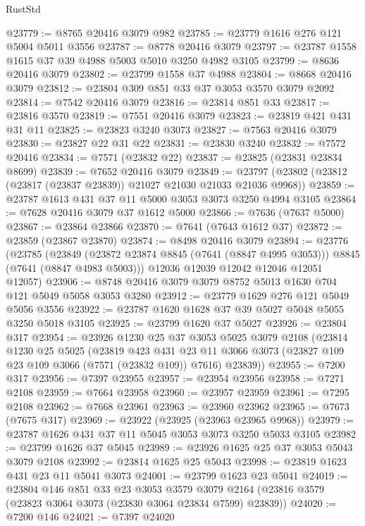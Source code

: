 \begin{lexlean}{RustStd}
\begin{coremodule}
@23779 := @8765 @20416 @3079 @982
@23785 := @23779 @1616 @276 @121 @5004 @5011 @3556
@23787 := @8778 @20416 @3079
@23797 := @23787 @1558 @1615 @37 @39 @4988 @5003 @5010 @3250 @4982 @3105
@23799 := @8636 @20416 @3079
@23802 := @23799 @1558 @37 @4988
@23804 := @8668 @20416 @3079
@23812 := @23804 @309 @851 @33 @37 @3053 @3570 @3079 @2092
@23814 := @7542 @20416 @3079
@23816 := @23814 @851 @33
@23817 := @23816 @3570
@23819 := @7551 @20416 @3079
@23823 := @23819 @421 @431 @31 @11
@23825 := @23823 @3240 @3073
@23827 := @7563 @20416 @3079
@23830 := @23827 @22 @31 @22
@23831 := @23830 @3240
@23832 := @7572 @20416
@23834 := @7571 (@23832 @22)
@23837 := @23825 (@23831 @23834 @8699)
@23839 := @7652 @20416 @3079
@23849 := @23797 (@23802 (@23812 (@23817 (@23837 @23839)) @21027 @21030 @21033 @21036 @9968))
@23859 := @23787 @1613 @431 @37 @11 @5000 @3053 @3073 @3250 @4994 @3105
@23864 := @7628 @20416 @3079 @37 @1612 @5000
@23866 := @7636 (@7637 @5000)
@23867 := @23864 @23866
@23870 := @7641 (@7643 @1612 @37)
@23872 := @23859 (@23867 @23870)
@23874 := @8498 @20416 @3079
@23894 := @23776
    (@23785
      (@23849 (@23872 @23874 @8845 (@7641 (@8847 @4995 @3053))) @8845 (@7641 (@8847 @4983 @5003)))
      @12036
      @12039
      @12042
      @12046
      @12051
      @12057)
@23906 := @8748 @20416 @3079 @3079 @8752 @5013 @1630 @704 @121 @5049 @5058 @3053 @3280
@23912 := @23779 @1629 @276 @121 @5049 @5056 @3556
@23922 := @23787 @1620 @1628 @37 @39 @5027 @5048 @5055 @3250 @5018 @3105
@23925 := @23799 @1620 @37 @5027
@23926 := @23804 @317
@23954 := @23926
    @1230
    @25
    @37
    @3053
    @5025
    @3079
    @2108
    (@23814
      @1230
      @25
      @5025
      (@23819
        @423
        @431
        @23
        @11
        @3066
        @3073
        (@23827 @109 @23 @109 @3066 (@7571 (@23832 @109)) @7616)
        @23839))
@23955 := @7200 @317
@23956 := @7397 @23955
@23957 := @23954 @23956
@23958 := @7271 @2108
@23959 := @7664 @23958
@23960 := @23957 @23959
@23961 := @7295 @2108
@23962 := @7668 @23961
@23963 := @23960 @23962
@23965 := @7673 (@7675 @317)
@23969 := @23922 (@23925 (@23963 @23965 @9968))
@23979 := @23787 @1626 @431 @37 @11 @5045 @3053 @3073 @3250 @5033 @3105
@23982 := @23799 @1626 @37 @5045
@23989 := @23926 @1625 @25 @37 @3053 @5043 @3079 @2108
@23992 := @23814 @1625 @25 @5043
@23998 := @23819 @1623 @431 @23 @11 @5041 @3073
@24001 := @23799 @1623 @23 @5041
@24019 := @23804
    @146
    @851
    @33
    @23
    @3053
    @3579
    @3079
    @2164
    (@23816 @3579 (@23823 @3064 @3073 (@23830 @3064 @23834 @7599) @23839))
@24020 := @7200 @146
@24021 := @7397 @24020

\end{coremodule}
\end{lexlean}
